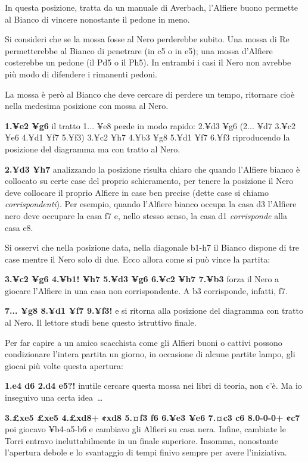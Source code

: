 \documentclass[
]{article}
\begin{document}
In questa posizione, tratta da un manuale di Averbach, l'Alfiere buono
permette al Bianco di vincere nonostante il pedone in meno.

Si consideri che se la mossa fosse al Nero perderebbe subito. Una mossa
di Re permetterebbe al Bianco di penetrare (in c5 o in e5); una mossa
d'Alfiere costerebbe un pedone (il Pd5 o il Ph5). In entrambi i casi il
Nero non avrebbe più modo di difendere i rimanenti pedoni.

La mossa è però al Bianco che deve cercare di perdere un tempo,
ritornare cioè nella medesima posizione con mossa al Nero.

\textbf{1.¥e2 ¥g6} il tratto 1... ¥e8 pe¢de in modo rapido: 2.¥d3 ¥g6
(2... ¥d7 3.¥c2 ¥e6 4.¥d1 ¥f7 5.¥f3) 3.¥c2 ¥h7 4.¥b3 ¥g8 5.¥d1 ¥f7 6.¥f3
riproducendo la posizione del diagramma ma con tratto al Nero.

\textbf{2.¥d3 ¥h7} analizzando la posizione risulta chiaro che quando
l'Alfiere bianco è collocato su certe case del proprio schieramento, per
tenere la posizione il Nero deve collocare il proprio Alfiere in case
ben precise (dette case si chiamo \emph{corrispondenti}). Per esempio,
quando l'Alfiere bianco occupa la casa d3 l'Alfiere nero deve occupare
la casa f7 e, nello stesso senso, la casa d1 \emph{corrisponde} alla
casa e8.

Si osservi che nella posizione data, nella diagonale b1-h7 il Bianco
dispone di tre case mentre il Nero solo di due. Ecco allora come si può
vince la partita:

\textbf{3.¥c2 ¥g6 4.¥b1! ¥h7 5.¥d3 ¥g6 6.¥c2 ¥h7 7.¥b3} forza il Nero a
giocare l'Alfiere in una casa non corrispondente. A b3 corrisponde,
infatti, f7.

\textbf{7... ¥g8 8.¥d1 ¥f7 9.¥f3!} e si ritorna alla posizione del
diagramma con tratto al Nero. Il lettore studi bene questo istruttivo
finale.

Per far capire a un amico scacchista come gli Alfieri buoni o cattivi
possono condizionare l'intera partita un giorno, in occasione di alcune
partite lampo, gli giocai più volte questa apertura:

\textbf{1.e4 d6 2.d4 e5?!} inutile cercare questa mossa nei libri di
teoria, non c'è. Ma io inseguivo una certa idea~\ldots{}

\textbf{3.£xe5 £xe5 4.£xd8+ ¢xd8 5.¤f3 f6 6.¥e3 ¥e6 7.¤c3 c6 8.0-0-0+
¢c7} poi giocavo ¥b4-a5-b6 e cambiavo gli Alfieri su casa nera. Infine,
cambiate le Torri entravo ineluttabilmente in un finale superiore.
Insomma, nonostante l'apertura debole e lo svantaggio di tempi finivo
sempre per avere l'iniziativa.
\end{document}
